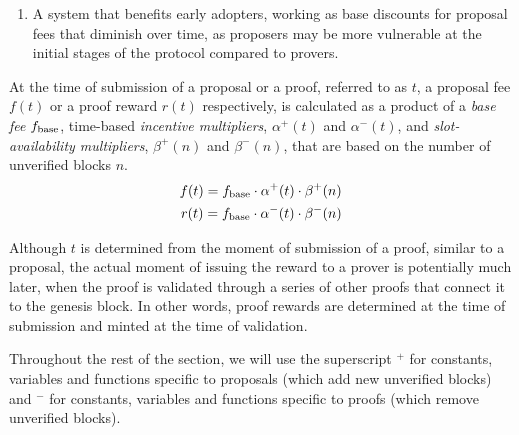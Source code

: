 \documentclass[9pt,oneside]{amsart}
\begin{document}
\begin{multicols}{2}
\begin{enumerate}
\item A system that benefits early adopters, working as base discounts for proposal fees that diminish over time, as proposers may be more vulnerable at the initial stages of the protocol compared to provers.
\end{enumerate}


At the time of submission of a proposal or a proof, referred to as $t$, a proposal fee $f(t)$ or a proof reward $r(t)$ respectively, is calculated as a product of a \textit{base fee} $f_\textnormal{base}$, time-based \emph{incentive multipliers}, $\alpha^+(t)$ and $\alpha^-(t)$, and \emph{slot-availability multipliers}, $\beta^+(n)$ and $\beta^-(n)$, that are based on the number of unverified blocks $n$.
\begin{align}
f(t) = f_\textnormal{base} \cdot \alpha^+(t) \cdot \beta^+(n)
\\
r(t) = f_\textnormal{base}
\cdot \alpha^-(t) \cdot \beta^-(n)
\end{align}

Although $t$ is determined from the moment of submission of a proof, similar to a proposal, the actual moment of issuing the reward to a prover is potentially much later, when the proof is validated through a series of other proofs that connect it to the genesis block. In other words, proof rewards are determined at the time of submission and minted at the time of validation. 

Throughout the rest of the section, we will use the superscript $^+$ for constants, variables and functions specific to proposals (which add new unverified blocks) and $^-$ for constants, variables and functions specific to proofs (which remove unverified blocks). 



\end{multicols}
\end{document}
